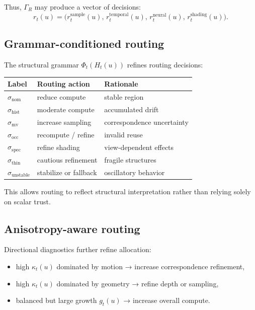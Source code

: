 \documentclass[11pt]{article}
\theoremstyle{definition}
\theoremstyle{plain}
\begin{document}
Thus, $\Gamma_R$ may produce a vector of decisions:
\begin{equation}
r_t(u)=\bigl(r^{\mathrm{sample}}_t(u),\,r^{\mathrm{temporal}}_t(u),\,r^{\mathrm{neural}}_t(u),\,r^{\mathrm{shading}}_t(u)\bigr).
\end{equation}


\subsection{Grammar-conditioned routing}

The structural grammar $\Phi_t(H_t(u))$ refines routing decisions:

\begin{center}
\begin{tabular}{lll}
\toprule
Label & Routing action & Rationale \\
\midrule
$\sigma_{\mathrm{nom}}$ & reduce compute & stable region \\
$\sigma_{\mathrm{hist}}$ & moderate compute & accumulated drift \\
$\sigma_{\mathrm{mv}}$ & increase sampling & correspondence uncertainty \\
$\sigma_{\mathrm{occ}}$ & recompute / refine & invalid reuse \\
$\sigma_{\mathrm{spec}}$ & refine shading & view-dependent effects \\
$\sigma_{\mathrm{thin}}$ & cautious refinement & fragile structures \\
$\sigma_{\mathrm{unstable}}$ & stabilize or fallback & oscillatory behavior \\
\bottomrule
\end{tabular}
\end{center}

This allows routing to reflect structural interpretation rather than relying solely on scalar trust.


\subsection{Anisotropy-aware routing}

Directional diagnostics further refine allocation:
\begin{itemize}[leftmargin=1.5em]
    \item high $\kappa_t(u)$ dominated by motion → increase correspondence refinement,
    \item high $\kappa_t(u)$ dominated by geometry → refine depth or sampling,
    \item balanced but large growth $g_t(u)$ → increase overall compute.
\end{itemize}
\end{document}
